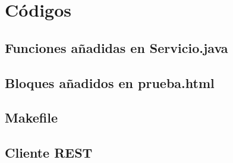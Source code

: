 \documentclass[10pt,executivepaper]{article}
\begin{document}
\section{Códigos}
\subsection{Funciones añadidas en Servicio.java}

\subsection{Bloques añadidos en prueba.html}

\subsection{Makefile}

\subsection{Cliente REST}



\end{document}
